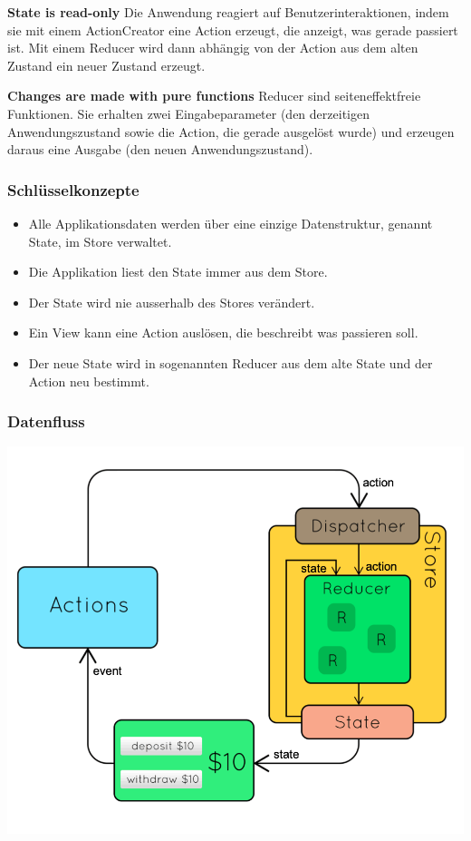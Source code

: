 \textbf{State is read-only}
Die Anwendung reagiert auf Benutzerinteraktionen, indem sie mit einem ActionCreator eine Action erzeugt, die anzeigt, was gerade passiert ist. Mit einem Reducer wird dann abhängig von der Action aus dem alten Zustand ein neuer Zustand erzeugt.

\textbf{Changes are made with pure functions}
Reducer sind seiteneffektfreie Funktionen. Sie erhalten zwei Eingabeparameter (den derzeitigen Anwendungszustand sowie die Action, die gerade ausgelöst wurde) und erzeugen daraus eine Ausgabe (den neuen Anwendungszustand).

\subsubsection{Schlüsselkonzepte}

\begin{itemize}
	\item Alle Applikationsdaten werden über eine einzige Datenstruktur, genannt State, im Store verwaltet.
	\item Die Applikation liest den State immer aus dem Store.
	\item Der State wird nie ausserhalb des Stores verändert.
	\item Ein View kann eine Action auslösen, die beschreibt was passieren soll.
	\item Der neue State wird in sogenannten Reducer aus dem alte State und der Action neu bestimmt.
\end{itemize}

\subsubsection{Datenfluss}

\includegraphics[width=\columnwidth]{images/datenfluss}

